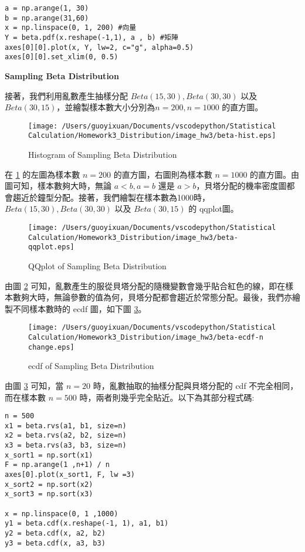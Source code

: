 \bigskip
\begin{lstlisting}
a = np.arange(1, 30)
b = np.arange(31,60)
x = np.linspace(0, 1, 200) #向量
Y = beta.pdf(x.reshape(-1,1), a , b) #矩陣
axes[0][0].plot(x, Y, lw=2, c="g", alpha=0.5)
axes[0][0].set_xlim(0, 0.5)
\end{lstlisting}

\textbf{Sampling Beta Distribution}

接著，我們利用亂數產生抽樣分配 $Beta(15,30),Beta(30,30)$ 以及 $Beta(30,15)$，並繪製樣本數大小分別為$n=200, n=1000$ 的直方圖。

\begin{figure}[H]
    \centering
        \texttt{[image: /Users/guoyixuan/Documents/vscodepython/Statistical Calculation/Homework3\_Distribution/image\_hw3/beta-hist.eps]}
    \caption{Histogram of Sampling Beta Distribution}
    \label{beta-hist}
\end{figure}

在 \ref{beta-hist} 的左圖為樣本數 $n=200$ 的直方圖，右圖則為樣本數 $n=1000$ 的直方圖。由圖可知，樣本數夠大時，無論 $a<b,a=b$ 還是 $a>b$，貝塔分配的機率密度圖都會趨近於鐘型分配。接著，我們繪製在樣本數為1000時， $Beta(15,30),Beta(30,30)$ 以及 $Beta(30,15)$ 的 qqplot圖。

\begin{figure}[H]
    \centering
        \texttt{[image: /Users/guoyixuan/Documents/vscodepython/Statistical Calculation/Homework3\_Distribution/image\_hw3/beta-qqplot.eps]}
    \caption{QQplot of Sampling Beta Distribution}
    \label{beta-qqplot}
\end{figure}

由圖 \ref{beta-qqplot} 可知，亂數產生的服從貝塔分配的隨機變數會幾乎貼合紅色的線，即在樣本數夠大時，無論參數的值為何，貝塔分配都會趨近於常態分配。最後，我們亦繪製不同樣本數時的 ecdf 圖，如下圖 \ref{beta-ecdf-n change}。

\begin{figure}[H]
    \centering
        \texttt{[image: /Users/guoyixuan/Documents/vscodepython/Statistical Calculation/Homework3\_Distribution/image\_hw3/beta-ecdf-n change.eps]}
    \caption{ecdf of Sampling Beta Distribution}
    \label{beta-ecdf-n change}
\end{figure}

由圖 \ref{beta-ecdf-n change} 可知，當 $n=20$ 時，亂數抽取的抽樣分配與貝塔分配的 cdf 不完全相同，而在樣本數 $n=500$ 時，兩者則幾乎完全貼近。以下為其部分程式碼:

\bigskip
\begin{lstlisting}
n = 500
x1 = beta.rvs(a1, b1, size=n)
x2 = beta.rvs(a2, b2, size=n)
x3 = beta.rvs(a3, b3, size=n)
x_sort1 = np.sort(x1)
F = np.arange(1 ,n+1) / n 
axes[0].plot(x_sort1, F, lw =3)
x_sort2 = np.sort(x2)
x_sort3 = np.sort(x3)

x = np.linspace(0, 1 ,1000)
y1 = beta.cdf(x.reshape(-1, 1), a1, b1)
y2 = beta.cdf(x, a2, b2)
y3 = beta.cdf(x, a3, b3)
\end{lstlisting}

